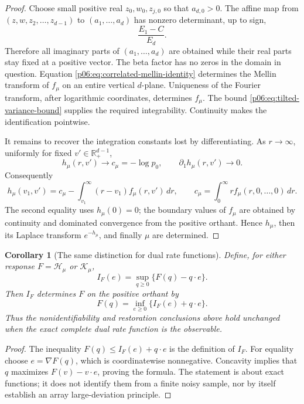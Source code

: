 \documentclass[11pt,letterpaper]{article}
\newtheorem{corollary}[theorem]{Corollary}
\theoremstyle{definition}
\theoremstyle{remark}
\newcommand{\1}{\mathbf 1}
\begin{document}
\begin{proof}
Choose small positive real $z_0,w_0,z_{j,0}$ so that $a_{d,0}>0$.
The affine map from $(z,w,z_2,\ldots,z_{d-1})$ to $(a_1,\ldots,a_d)$
has nonzero determinant, up to sign,
\[
 \frac{E_1-C}{E_d}.
\]
Therefore all imaginary parts of $(a_1,\ldots,a_d)$ are obtained while
their real parts stay fixed at a positive vector. The beta factor has
no zeros in the domain in question. Equation
\eqref{p06:eq:correlated-mellin-identity} determines the Mellin transform of
$f_\mu$ on an entire vertical $d$-plane. Uniqueness of the Fourier
transform, after logarithmic coordinates, determines $f_\mu$.
The bound \eqref{p06:eq:tilted-variance-bound} supplies the required
integrability. Continuity makes the identification pointwise.

It remains to recover the integration constants lost by differentiating.
As $r\to\infty$, uniformly for fixed $v'\in\mathbb R_+^{d-1}$,
\[
 h_\mu(r,v')\longrightarrow c_\mu=-\log p_0,
 \qquad \partial_1h_\mu(r,v')\longrightarrow0.
\]
Consequently
\begin{equation}\label{p06:eq:recover-h-from-variance}
 h_\mu(v_1,v')=c_\mu-
    \int_{v_1}^\infty(r-v_1)f_\mu(r,v')\,dr,
 \qquad
 c_\mu=\int_0^\infty r f_\mu(r,0,\ldots,0)\,dr.
\end{equation}
The second equality uses $h_\mu(0)=0$; the boundary values of $f_\mu$
are obtained by continuity and dominated convergence from the positive
orthant. Hence $h_\mu$, then its Laplace transform $e^{-h_\mu}$, and
finally $\mu$ are determined.
\end{proof}

\begin{corollary}[The same distinction for dual rate functions]
\label{p06:cor:rate-identification}
Define, for either response $F=\mathcal H_\mu$ or $\mathcal K_\mu$,
\[
 I_F(e)=\sup_{q\ge0}\{F(q)-q\cdot e\}.
\]
Then $I_F$ determines $F$ on the positive orthant by
\[
 F(q)=\inf_{e\ge0}\{I_F(e)+q\cdot e\}.
\]
Thus the nonidentifiability and restoration conclusions above hold
unchanged when the exact complete dual rate function is the observable.
\end{corollary}
\begin{proof}
The inequality $F(q)\le I_F(e)+q\cdot e$ is the definition of $I_F$.
For equality choose $e=\nabla F(q)$, which is coordinatewise nonnegative.
Concavity implies that $q$ maximizes $F(v)-v\cdot e$, proving the formula.
The statement is about exact functions; it does not identify them from a
finite noisy sample, nor by itself establish an array large-deviation
principle.
\end{proof}
\end{document}
